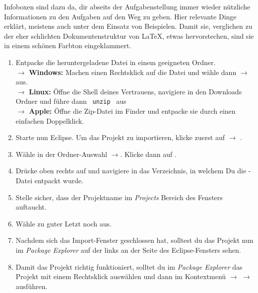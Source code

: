 
\label{ex1}

\begin{Infobox}[Infoboxen]
	Infoboxen sind dazu da, dir abseits der Aufgabenstellung immer wieder nützliche Informationen zu den Aufgaben auf den Weg zu geben. Hier relevante Dinge erklärt, meistens auch unter dem Einsatz von Beispielen.\newline
	Damit sie, verglichen zu der eher schlichten Dokumentenstruktur von \LaTeX, etwas hervorstechen, sind sie in einem \color{javaInstances} schönen Farbton eingeklammert.
\end{Infobox}

\begin{Infobox}
    \begin{enumerate}[label=\arabic*.]
		\item Entpacke die heruntergeladene \texttt{\jvkpackage} Datei in einem geeigneten Ordner.\\
		$\rightarrow$ \textbf{Windows:} Machen einen Rechtsklick auf die Datei und wähle dann
		$\to$
		aus.\\
        $\rightarrow$ \textbf{Linux:} Öffne die Shell deines Vertrauens, navigiere in den Downloads Ordner und führe dann
		\texttt{\textdollar~unzip \jvkpackage}
		aus\\
        $\rightarrow$ \textbf{Apple:} Öffne die Zip-Datei im Finder und entpacke sie durch einen einfachen Doppelklick.
        \item Starte nun Eclipse. Um das Projekt zu importieren, klicke zuerst auf  $\to$ .
        \item Wähle in der Ordner-Auswahl $\to$. Klicke dann auf .
        \item Drücke oben rechts auf  und navigiere in das Verzeichnis, in welchem Du die \jvkpackage-Datei entpackt wurde.
        \item Stelle sicher, dass der Projektname im \textit{Projects} Bereich des Fensters auftaucht.
        \item Wähle zu guter Letzt noch  aus.
        \item Nachdem sich das Import-Fenster geschlossen hat, solltest du das Projekt nun im \textit{Package Explorer} auf der links an der Seite des Eclipse-Fensters sehen.
        \item Damit das Projekt richtig funktioniert, solltet du im \textit{Package Explorer} das Projekt mit einem Rechtsklick auswählen und dann im Kontextmenü  $\to$  $\to$  ausführen.
    \end{enumerate}
\end{Infobox}

